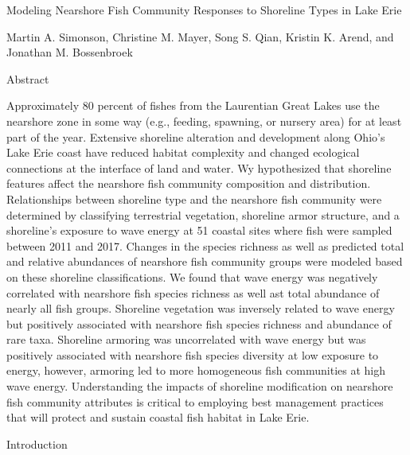 \documentclass[12pt]{article} %
\begin{document}
\doublespacing

\noindent
Modeling Nearshore Fish Community Responses to Shoreline Types in Lake Erie 

\vspace{\baselineskip}

\noindent
Martin A. Simonson, Christine M. Mayer, Song S. Qian, Kristin K. Arend, and Jonathan M. Bossenbroek

\vspace{\baselineskip}

\noindent
Abstract

Approximately 80 percent of fishes from the Laurentian Great Lakes use the nearshore zone in some way (e.g., feeding, spawning, or nursery area) for at least part of the year. Extensive shoreline alteration and development along Ohio's Lake Erie coast have reduced habitat complexity and changed ecological connections at the interface of land and water. Wy hypothesized that shoreline features affect the nearshore fish community composition and distribution. Relationships between shoreline type and the nearshore fish community were determined by classifying  terrestrial vegetation, shoreline armor structure, and a shoreline's exposure to wave energy at 51 coastal sites where fish were sampled between 2011 and 2017. Changes in the species richness as well as predicted total and relative abundances of nearshore fish community groups were modeled based on these shoreline classifications. We found that wave energy was negatively correlated with nearshore fish species richness as well ast total abundance of nearly all fish groups. Shoreline vegetation was inversely related to wave energy but positively associated with nearshore fish species richness and abundance of rare taxa. Shoreline armoring was uncorrelated with wave energy but was positively associated with nearshore fish species diversity at low exposure to energy, however, armoring led to more homogeneous fish communities at high wave energy. Understanding the impacts of shoreline modification on nearshore fish community attributes is critical to employing best management practices that will protect and sustain coastal fish habitat in Lake Erie.

\vspace{\baselineskip}

\noindent
Introduction
\end{document}

